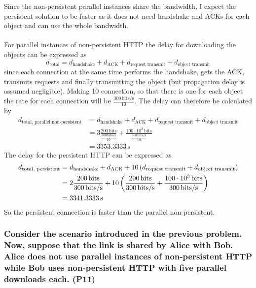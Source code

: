 Since the non-persistent parallel instances share the bandwidth, I expect the persistent solution to be faster as it does not need handshake and ACKs for each object and can use the whole bandwidth. \\
\\
For parallel instances of non-persistent HTTP the delay for downloading the objects can be expressed as
\begin{equation*}
    d_\text{total} = d_\text{handshake} + d_\text{ACK} + d_\text{request transmit} + d_\text{object transmit}
\end{equation*}
since each connection at the same time performs the handshake, gets the ACK, transmits requests and finally transmitting the object (but propagation delay is assumed negligible). Making 10 connection, so that there is one for each object the rate for each connection will be $\frac{300 \, \text{bits/s}}{10}$. The delay can therefore be calculated by
\begin{equation*}
\begin{split}
    d_\text{total, parallel non-persistent} &= d_\text{handshake} + d_\text{ACK} + d_\text{request transmit} + d_\text{object transmit} \\
    &= 3 \frac{200 \, \text{bits}}{\frac{300 \, \text{bits/s}}{10}} + \frac{100 \cdot 10^3 \, \text{bits}}{\frac{300 \, \text{bits/s}}{10}} \\
    &= 3353.3333 \, \text{s}
\end{split}
\end{equation*}
The delay for the persistent HTTP can be expressed as
\begin{equation*}
    \begin{split}
        d_\text{total, persistent} &= d_\text{handshake} + d_\text{ACK} + 10 \left (d_\text{request transmit} + d_\text{object transmit}\right) \\
        &= 2 \frac{200 \, \text{bits}}{300 \, \text{bits/s}} + 10 \left (\frac{200 \, \text{bits}}{300 \, \text{bits/s}} + \frac{100 \cdot 10^3 \, \text{bits}}{300 \, \text{bits/s}}\right) \\
        &= 3341.3333 \, \text{s}
\end{split}
\end{equation*}
So the persistent connection is faster than the parallel non-persistent.

\subsubsection{Consider the scenario introduced in the previous problem. Now, suppose that the link is shared by Alice with Bob. Alice does not use parallel instances of non-persistent HTTP while Bob uses non-persistent HTTP with five parallel
downloads each. (P11)}

